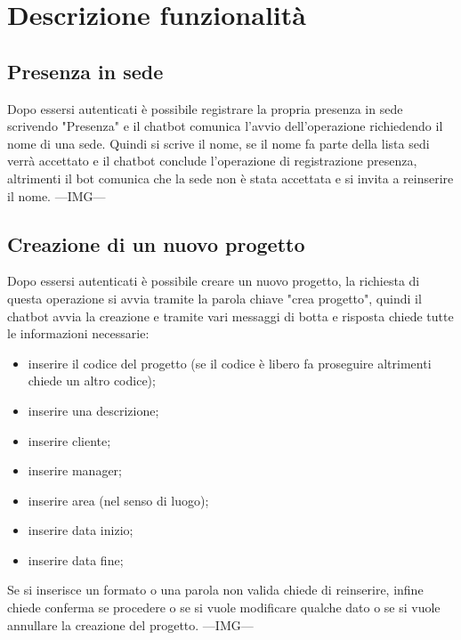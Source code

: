 \section{Descrizione funzionalità}
\subsection{Presenza in sede}
Dopo essersi autenticati è possibile registrare la propria presenza in sede scrivendo "Presenza" e il chatbot comunica l'avvio dell'operazione richiedendo il nome di una sede. 
Quindi si scrive il nome, se il nome fa parte della lista sedi verrà accettato e il chatbot conclude l'operazione di registrazione presenza, altrimenti il bot comunica che la sede non è stata accettata e si invita a reinserire il nome. ---IMG--- \newline
\subsection{Creazione di un nuovo progetto}
Dopo essersi autenticati è possibile creare un nuovo progetto, la richiesta di questa operazione si avvia tramite la parola chiave "crea progetto", quindi il chatbot avvia la creazione e tramite vari messaggi di botta e risposta chiede tutte le informazioni necessarie:
\begin{itemize}
    \item inserire il codice del progetto (se il codice è libero fa proseguire altrimenti chiede un altro codice);
    \item inserire una descrizione;
    \item inserire cliente;
    \item inserire manager;
    \item inserire area (nel senso di luogo);
    \item inserire data inizio;
    \item inserire data fine;
\end{itemize}
Se si inserisce un formato o una parola non valida chiede di reinserire, infine chiede conferma se procedere o se si vuole modificare qualche dato o se si vuole annullare la creazione del progetto. ---IMG---
